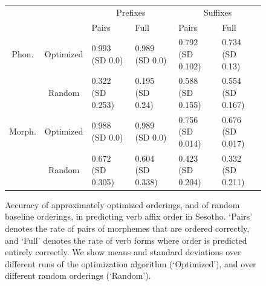 \begin{figure}
\begin{tabular}{cc||ll|ll}
             &              & \multicolumn{2}{c}{Prefixes}    & \multicolumn{2}{|c}{Suffixes} \\
             &              & Pairs & Full & Pairs & Full \\ \hline\hline
Phon.   &   Optimized  &  0.993 (SD 0.0) & 0.989 (SD 0.0) & 0.792 (SD 0.102) & 0.734 (SD 0.13) \\
	& Random  &  0.322 (SD 0.253) & 0.195 (SD 0.24) & 0.588 (SD 0.155) & 0.554 (SD 0.167) \\ \hline
Morph.  &   Optimized  &  0.988 (SD 0.0) & 0.989 (SD 0.0) & 0.756 (SD 0.014) & 0.676 (SD 0.017) \\
&   Random  &  0.672 (SD 0.305) & 0.604 (SD 0.338) & 0.423 (SD 0.204) & 0.332 (SD 0.211) \\ 
\end{tabular}
\caption{Accuracy of approximately optimized orderings, and of random baseline orderings, in predicting verb affix order in Sesotho. `Pairs' denotes the rate of pairs of morphemes that are ordered correctly, and `Full' denotes the rate of verb forms where order is predicted entirely correctly. We show means and standard deviations over different runs of the optimization algorithm (`Optimized'), and over different random orderings (`Random').}\label{fig:acc-sesotho}
\end{figure}
